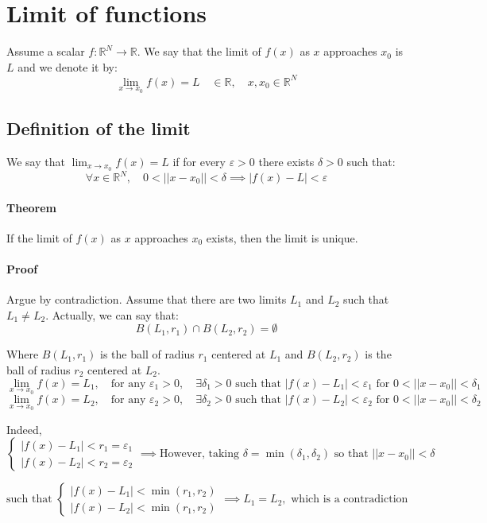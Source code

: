 \documentclass[11pt]{article}
\begin{document}
\section{Limit of functions}
Assume a scalar $f : \mathbb{R}^N \rightarrow \mathbb{R}$.
We say that the limit of $f(x)$ as $x$ approaches $x_0$ is $L$ and we denote it by:
\[
\lim_{x \to x_0} f(x) = L \quad \in \mathbb{R}, \quad x, x_0 \in \mathbb{R}^N
\]

\subsection{Definition of the limit}
We say that $\lim_{x \to x_0} f(x) = L$ if for every $\varepsilon > 0$ there exists $\delta > 0$ such that:
\[
\forall x \in \mathbb{R}^N, \quad 0 < ||x - x_0|| < \delta \implies |f(x) - L| < \varepsilon
\]

\paragraph{Theorem}
If the limit of $f(x)$ as $x$ approaches $x_0$ exists, then the limit is unique.

\paragraph{Proof}
Argue by contradiction. Assume that there are two limits $L_1$ and $L_2$ such that $L_1 \neq L_2$.
\vskip 0.5cm
Actually, we can say that:
\[
B(L_1, r_1) \cap B(L_2, r_2) = \emptyset
\]

Where $B(L_1, r_1)$ is the ball of radius $r_1$ centered at $L_1$ and $B(L_2, r_2)$ is the ball of radius $r_2$ centered at $L_2$.
\[
\lim_{x \to x_0} f(x) = L_1, \quad \text{for any } \varepsilon_1 > 0, \quad \exists \delta_1 > 0 \text{ such that } |f(x) - L_1| < \varepsilon_1 \text{ for } 0 < ||x - x_0|| < \delta_1
\]
\[
\lim_{x \to x_0} f(x) = L_2, \quad \text{for any } \varepsilon_2 > 0, \quad \exists \delta_2 > 0 \text{ such that } |f(x) - L_2| < \varepsilon_2 \text{ for } 0 < ||x - x_0|| < \delta_2
\]

Indeed, 
\[
\begin{cases}
    |f(x) - L_1| < r_1 = \varepsilon_1 \\
    |f(x) - L_2| < r_2 = \varepsilon_2
\end{cases}
\implies \text{However, taking } \delta = \min(\delta_1, \delta_2) \text{ so that } ||x - x_0|| < \delta
\]

\[
\text{such that } 
\begin{cases}
    |f(x) - L_1| < \min(r_1 , r_2) \\
    |f(x) - L_2| < \min(r_1 , r_2) 
\end{cases}    
\implies L_1 = L_2, \text{ which is a contradiction}
\]
\end{document}
